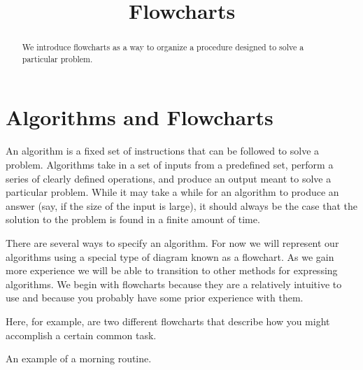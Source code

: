 \documentclass{ximera}
\title{Flowcharts}
\begin{document}
\begin{abstract}
We introduce flowcharts as a way to organize a procedure designed to solve a particular problem.
\end{abstract}
\maketitle

\section{Algorithms and Flowcharts}
An algorithm is a fixed set of instructions that can be followed to solve a problem. Algorithms take in a set of inputs from a predefined set, perform a series of clearly defined operations, and produce an output meant to solve a particular problem. While it may take a while for an algorithm to produce an answer (say, if the size of the input is large), it should always be the case that the solution to the problem is found in a finite amount of time.

There are several ways to specify an algorithm. For now we will represent our algorithms using a special type of diagram known as a flowchart. As we gain more experience we will be able to transition to other methods for expressing algorithms. We begin with flowcharts because they are a relatively intuitive to use and because you probably have some prior experience with them.

Here, for example, are two different flowcharts that describe how you might accomplish a certain common task.

\begin{center}
\end{center}
\begin{center}
	An example of a morning routine.
\end{center}
\end{document}

